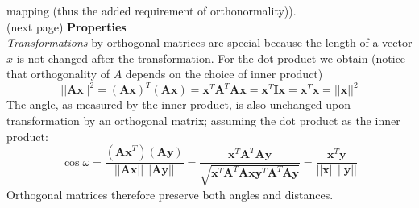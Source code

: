 \documentclass{report}
\begin{document}
mapping (thus the added requirement of orthonormality)).\\
(next page)
\newpage
\noindent\textbf{Properties}\\
\textit{Transformations} by orthogonal matrices are special because the length of a vector $x$ is not
changed after the transformation. For the dot product we obtain 
(notice that orthogonality of $A$ depends on the choice of inner product)
\begin{equation*}
||\bm{Ax}||^2=(\bm{Ax})^T(\bm{Ax})=\bm{x}^T\bm{A}^T\bm{Ax}
=\bm{x}^T\bm{Ix}=\bm{x}^T\bm{x}=||\bm{x}||^2
\end{equation*}
The angle, as measured by the inner product, is also unchanged upon transformation by an orthogonal matrix; 
assuming the dot product as the inner product:
\begin{equation*}
\cos\omega=\frac{(\bm{Ax}^T)(\bm{Ay})}{||\bm{Ax}||\,||\bm{Ay}||}
=\frac{\bm{x}^T\bm{A}^T\bm{Ay}}{\sqrt{\bm{x}^T\bm{A}^T\bm{Ax}\bm{y}^T\bm{A}^T\bm{Ay}}}
=\frac{\bm{x}^T\bm{y}}{||\bm{x}||\,||\bm{y}||}
\end{equation*}
Orthogonal matrices therefore preserve both angles and distances. 
\newpage
\end{document}
